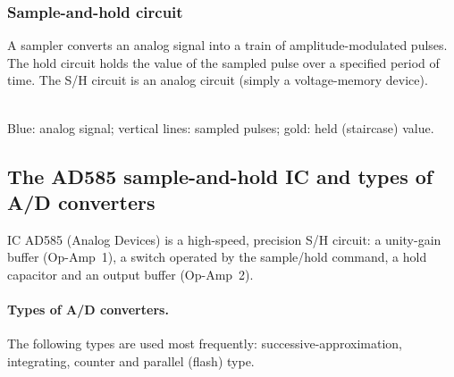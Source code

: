 \subsubsection*{Sample-and-hold circuit}
A sampler converts an analog signal into a train of amplitude-modulated pulses. The hold circuit holds the
value of the sampled pulse over a specified period of time. The S/H circuit is an analog circuit (simply a
voltage-memory device).

\begin{center}
\\[2pt]
{\small Blue: analog signal; vertical lines: sampled pulses; gold: held (staircase) value.}
\end{center}

\subsection{The AD585 sample-and-hold IC and types of A/D converters}
IC AD585 (Analog Devices) is a high-speed, precision S/H circuit: a unity-gain buffer (Op-Amp~1), a switch
operated by the sample/hold command, a hold capacitor and an output buffer (Op-Amp~2).

\begin{center}
\resizebox{\linewidth}{!}{}
\end{center}

\paragraph{Types of A/D converters.} The following types are used most frequently: successive-\allowbreak approximation, integrating, counter and parallel (flash) type.\par

